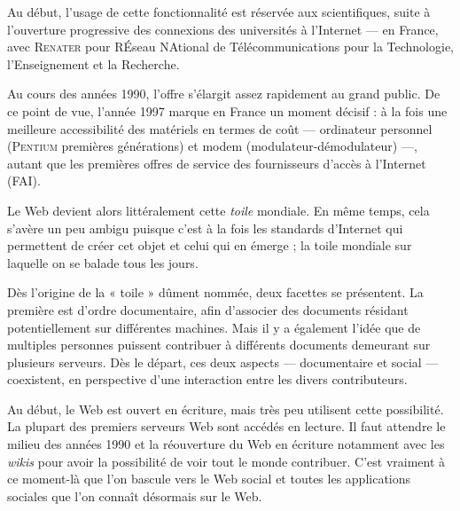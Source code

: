 Au début, l'usage de cette fonctionnalité est réservée aux scientifiques, suite à l'ouverture progressive des connexions des universités à l'Internet --- en France, avec \textsc{Renater} pour RÉseau NAtional de Télécommunications pour la Technologie, l'Enseignement et la Recherche.

Au cours des années 1990, l'offre s'élargit assez rapidement au grand public. De ce point de vue, l'année 1997 marque en France un moment décisif : à la fois une meilleure accessibilité des matériels en termes de coût --- ordinateur personnel (\textsc{Pentium} premières générations) et modem (modulateur-démodulateur) ---, autant que les premières offres de service des fournisseurs d'accès à l'Internet (\textsc{FAI}).

Le Web devient alors littéralement cette \emph{toile} mondiale. En même temps, cela s'avère un peu ambigu puisque c'est à la fois les standards d'Internet qui permettent de créer cet objet et celui qui en émerge ; la toile mondiale sur laquelle on se balade tous les jours. 

Dès l'origine de la « toile » dûment nommée, deux facettes se présentent. La première est d'ordre documentaire, afin d'associer des documents résidant potentiellement sur différentes machines. Mais il y a également l'idée que de multiples personnes puissent contribuer à différents documents demeurant sur plusieurs serveurs. Dès le départ, ces deux aspects --- documentaire et social --- coexistent, en perspective d'une interaction entre les divers contributeurs. 

Au début, le Web est ouvert en écriture, mais très peu utilisent cette possibilité. La plupart des premiers serveurs Web sont accédés en lecture. Il faut attendre le milieu des années 1990 et la réouverture du Web en écriture notamment avec les \textit{wikis} pour avoir la possibilité de voir tout le monde contribuer. C'est vraiment à ce moment-là que l'on bascule vers le Web social et toutes les applications sociales que l'on connaît désormais sur le Web.

